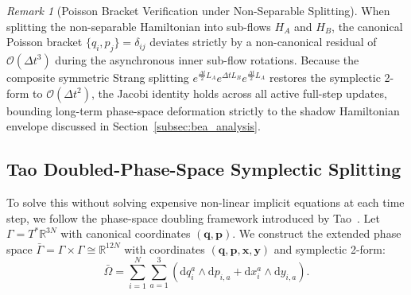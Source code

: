 \documentclass[11pt,a4paper,reqno]{article}
\theoremstyle{plain}
\theoremstyle{definition}
\theoremstyle{remark}
\newtheorem{remark}[theorem]{Remark}
\numberwithin{equation}{section}
\begin{document}
\begin{remark}[Poisson Bracket Verification under Non-Separable Splitting]
When splitting the non-separable Hamiltonian into sub-flows $H_A$ and $H_B$, the canonical Poisson bracket $\{q_i, p_j\} = \delta_{ij}$ deviates strictly by a non-canonical residual of $\mathcal{O}(\Delta t^3)$ during the asynchronous inner sub-flow rotations. Because the composite symmetric Strang splitting $e^{\frac{\Delta t}{2} L_A} e^{\Delta t L_B} e^{\frac{\Delta t}{2} L_A}$ restores the symplectic 2-form to $\mathcal{O}(\Delta t^2)$, the Jacobi identity holds across all active full-step updates, bounding long-term phase-space deformation strictly to the shadow Hamiltonian envelope discussed in Section~\ref{subsec:bea_analysis}.
\end{remark}

\subsection{Tao Doubled-Phase-Space Symplectic Splitting}
To solve this without solving expensive non-linear implicit equations at each time step, we follow the phase-space doubling framework introduced by Tao~\cite{Tao2016}. Let $\Gamma = T^*\mathbb{R}^{3N}$ with canonical coordinates $(\bm{q}, \bm{p})$. We construct the extended phase space $\bar{\Gamma} = \Gamma \times \Gamma \cong \mathbb{R}^{12N}$ with coordinates $(\bm{q}, \bm{p}, \bm{x}, \bm{y})$ and symplectic 2-form:
\begin{equation}
\bar{\Omega} = \sum_{i=1}^N \sum_{a=1}^3 \left( \mathrm{d}q_i^a \wedge \mathrm{d}p_{i, a} + \mathrm{d}x_i^a \wedge \mathrm{d}y_{i, a} \right).
\end{equation}
\end{document}

